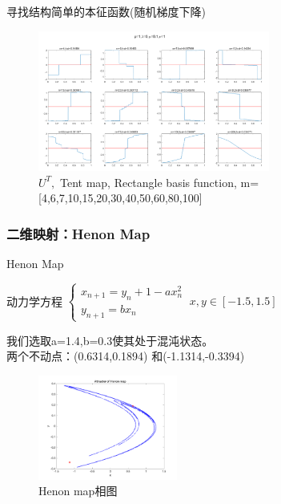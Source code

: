 \documentclass{beamer}
\begin{document}
\begin{frame}{寻找结构简单的本征函数(随机梯度下降)}
	\begin{figure}
		\centering
		\includegraphics[width=3in]{figure/tent_svg}
		\caption{$U^T,$ Tent map, Rectangle basis function, m=[4,6,7,10,15,20,30,40,50,60,80,100]}
	\end{figure}
\end{frame}

		\subsubsection{二维映射：Henon Map}
		\begin{frame}{Henon Map}
		\begin{block}{动力学方程}
			\centering
			\begin{math}
			\begin{cases}
				x_{n+1}=y_n+1-ax_n^2\\
				y_{n+1}=bx_n
			\end{cases}\ x,y\in [-1.5,1.5]
			\end{math}
		\end{block}
		我们选取a=1.4,b=0.3使其处于混沌状态。\\
		两个不动点：(0.6314,0.1894)
和(-1.1314,-0.3394)
		\begin{figure}
			\begin{minipage}{0.4\linewidth}
				\centering
				\includegraphics[width=1.8in]{figure/henon_phase}
				\caption{Henon map相图}
			\end{minipage}
		\end{figure}
		\end{frame}
\end{document}
